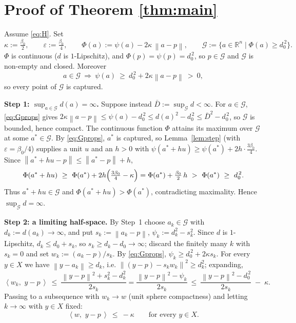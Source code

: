 \documentclass[11pt]{article}
\theoremstyle{remark}
\newcommand{\R}{\mathbb{R}}
\newcommand{\X}{X}
\newcommand{\sca}[2]{\left\langle #1,\, #2\right\rangle}
\newcommand{\norm}[1]{\left\lVert #1\right\rVert}
\begin{document}
\section{Proof of Theorem \ref{thm:main}}

Assume \eqref{eq:H}. Set
\[
\kappa:=\tfrac{\beta_0}{2},\qquad \varepsilon:=\tfrac{\beta_0}{4},\qquad
\Phi(a):=\psi(a)-2\kappa\,\norm{a-p},\qquad
\mathcal G:=\{a\in\R^n\mid \Phi(a)\ge d_0^{\,2}\}.
\]
$\Phi$ is continuous ($d$ is $1$-Lipschitz), and $\Phi(p)=\psi(p)=d_0^{\,2}$, so $p\in\mathcal G$
and $\mathcal G$ is non-empty and closed. Moreover
\begin{equation}\label{eq:Gprops}
a\in\mathcal G\ \Longrightarrow\ \psi(a)\ \ge\ d_0^{\,2}+2\kappa\norm{a-p}\ >\ 0,
\end{equation}
so every point of $\mathcal G$ is captured.

\medskip
\noindent\textbf{Step 1: $\sup_{a\in\mathcal G}d(a)=\infty$.}
Suppose instead $\bar D:=\sup_{\mathcal G}d<\infty$. For $a\in\mathcal G$,
\eqref{eq:Gprops} gives $2\kappa\norm{a-p}\le\psi(a)-d_0^{\,2}\le d(a)^2-d_0^{\,2}\le \bar
D^2-d_0^{\,2}$, so $\mathcal G$ is bounded, hence compact. The continuous function $\Phi$
attains its maximum over $\mathcal G$ at some $a^*\in\mathcal G$. By \eqref{eq:Gprops},
$a^*$ is captured, so Lemma~\ref{lem:step} (with $\varepsilon=\beta_0/4$) supplies a unit $u$
and an $h>0$ with $\psi(a^*+hu)\ge\psi(a^*)+2h\cdot\tfrac{3\beta_0}{4}$. Since
$\norm{a^*+hu-p}\le\norm{a^*-p}+h$,
\[
\Phi(a^*+hu)\ \ge\ \Phi(a^*)+2h\Bigl(\tfrac{3\beta_0}{4}-\kappa\Bigr)
=\Phi(a^*)+\tfrac{\beta_0}{2}\,h\ >\ \Phi(a^*)\ \ge\ d_0^{\,2} .
\]
Thus $a^*+hu\in\mathcal G$ and $\Phi(a^*+hu)>\Phi(a^*)$, contradicting maximality. Hence
$\sup_{\mathcal G}d=\infty$.

\medskip
\noindent\textbf{Step 2: a limiting half-space.}
By Step~1 choose $a_k\in\mathcal G$ with $d_k:=d(a_k)\to\infty$, and put
$s_k:=\norm{a_k-p}$, $\psi_k:=d_k^2-s_k^2$. Since $d$ is $1$-Lipschitz, $d_k\le d_0+s_k$, so
$s_k\ge d_k-d_0\to\infty$; discard the finitely many $k$ with $s_k=0$ and set
$w_k:=(a_k-p)/s_k$. By \eqref{eq:Gprops}, $\psi_k\ge d_0^{\,2}+2\kappa s_k$.
For every $y\in \X$ we have $\norm{y-a_k}\ge d_k$, i.e.
$\norm{(y-p)-s_kw_k}^2\ge d_k^2$; expanding,
\[
\sca{w_k}{\,y-p\,}\ \le\ \frac{\norm{y-p}^2+s_k^2-d_k^2}{2s_k}
=\frac{\norm{y-p}^2-\psi_k}{2s_k}
\ \le\ \frac{\norm{y-p}^2-d_0^{\,2}}{2s_k}\;-\;\kappa .
\]
Passing to a subsequence with $w_k\to w$ (unit sphere compactness) and letting $k\to\infty$
with $y\in\X$ fixed:
\begin{equation}\label{eq:halfspace}
\sca{w}{\,y-p\,}\ \le\ -\kappa\qquad\text{for every } y\in \X .
\end{equation}
\end{document}

